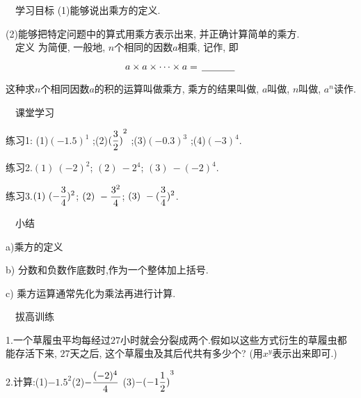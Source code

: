 \documentclass[twoside,12pt]{article}
\def\myskip{\par\vspace*{1in}}
\def\msection#1{{\heiti\numa~~#1}}
\def\qqquad{\quad\qquad}\def\qvuad{\hspace{4.5em}}
\begin{document}

\msection{学习目标}
(1)能够说出乘方的定义.\par
(2)能够把特定问题中的算式用乘方表示出来, 并正确计算简单的乘方.\\

\msection{定义}
  \kaishu  
  为简便, 一般地, $n$个相同的因数$a$相乘, 记作\lines, 即

      \vspace*{-1em}
      $$a\times a\times\cdots\times a= \,\underline{\mbox{\hspace{1.2cm}}}\,$$\par
      \vspace*{-.5em}
    这种求$n$个相同因数$a$的积的运算叫做乘方, 
    乘方的结果叫做\lines, $a$叫做\lines, $n$叫做\lines, $a^n$读作\lines[3].
  \songti
{}

\msection{课堂学习}
\noindent 


练习1: (1)$(-1.5)^1$ ;\qqquad (2)$\displaystyle {(\frac32)}^2$ ;\qqquad (3)$(-0.3)^3$ ;\qqquad (4)$(-3)^4$.
\myskip


练习2.$(1)\ (-2)^2$; \qvuad $(2)\ -2^4$; \qvuad $(3)\ -(-2)^4$.
\myskip

练习3.$(1)\ \displaystyle (-\frac34)^2$; \qvuad $(2)\ \displaystyle -\frac{3^2}4$; \qvuad $(3)\ \displaystyle -(\frac34)^2$.  
\myskip



\msection{小结}\par
a)乘方的定义 \par
b) 分数和负数作底数时,作为一个整体加上括号.\par
c) 乘方运算通常先化为乘法再进行计算.
\vspace{1em}

\msection{拔高训练}\par
  1.一个草履虫平均每经过$27$小时就会分裂成两个.假如以这些方式衍生的草履虫都能存活下来, $27$天之后, 这个草履虫及其后代共有多少个? (用$x^y$表示出来即可.)
\vspace{1em}

2.计算:(1)$-1.5^2$\qvuad (2)$\displaystyle -\frac{(-2)^4}{4}$ \qvuad (3)$\displaystyle -{(-1\frac12)}^3$
\end{document}
